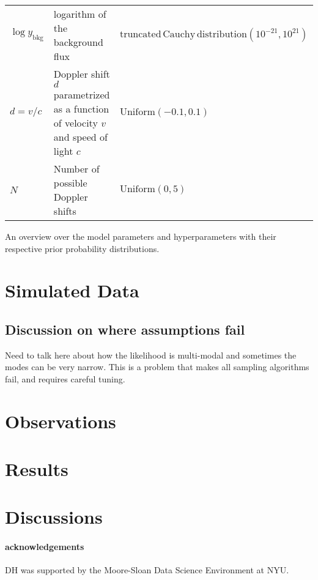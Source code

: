 \documentclass[12pt]{emulateapj}
\newcommand{\counts}{y}
\begin{document}
\begin{table*}[hbtp]
\begin{threeparttable}
\begin{tabularx}{\textwidth}{p{4.0cm}p{7.0cm}X}
$\log{\counts}_{\mathrm{bkg}}$ & logarithm of the background flux & $\mathrm{truncated\, Cauchy\, distribution}(10^{-21}, 10^{21})$ \\
$d = v/c$ & Doppler shift $d$ parametrized as a function of velocity $v$ and speed of light $c$ & $\mathrm{Uniform}(-0.1, 0.1)$ \\
$N$ & Number of possible Doppler shifts & $\mathrm{Uniform}(0,5)$  \\\bottomrule
\end{tabularx}
   \begin{tablenotes}
      \item{An overview over the model parameters and hyperparameters with their respective prior probability distributions.}
\end{tablenotes}
\end{threeparttable}
\label{tab:priortable}
\end{table*}



\section{Simulated Data}

\subsection{Discussion on where assumptions fail}

Need to talk here about how the likelihood is multi-modal and sometimes the modes can be very narrow. 
This is a problem that makes all sampling algorithms fail, and requires careful tuning.


\section{Observations}

\section{Results}


\section{Discussions}



\paragraph{acknowledgements}
DH was supported by the Moore-Sloan Data Science Environment at NYU. 



\end{document}
